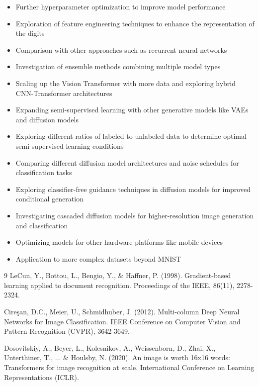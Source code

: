 \documentclass{article}
\begin{document}
\begin{itemize}
    \item Further hyperparameter optimization to improve model performance
    \item Exploration of feature engineering techniques to enhance the representation of the digits
    \item Comparison with other approaches such as recurrent neural networks
    \item Investigation of ensemble methods combining multiple model types
    \item Scaling up the Vision Transformer with more data and exploring hybrid CNN-Transformer architectures
    \item Expanding semi-supervised learning with other generative models like VAEs and diffusion models
    \item Exploring different ratios of labeled to unlabeled data to determine optimal semi-supervised learning conditions
    \item Comparing different diffusion model architectures and noise schedules for classification tasks
    \item Exploring classifier-free guidance techniques in diffusion models for improved conditional generation
    \item Investigating cascaded diffusion models for higher-resolution image generation and classification
    \item Optimizing models for other hardware platforms like mobile devices
    \item Application to more complex datasets beyond MNIST
\end{itemize}


\begin{thebibliography}{9}
LeCun, Y., Bottou, L., Bengio, Y., \& Haffner, P. (1998). Gradient-based learning applied to document recognition. Proceedings of the IEEE, 86(11), 2278-2324.

Cireşan, D.C., Meier, U., Schmidhuber, J. (2012). Multi-column Deep Neural Networks for Image Classification. IEEE Conference on Computer Vision and Pattern Recognition (CVPR), 3642-3649.

Dosovitskiy, A., Beyer, L., Kolesnikov, A., Weissenborn, D., Zhai, X., Unterthiner, T., ... \& Houlsby, N. (2020). An image is worth 16x16 words: Transformers for image recognition at scale. International Conference on Learning Representations (ICLR).
\end{thebibliography}
\end{document}
